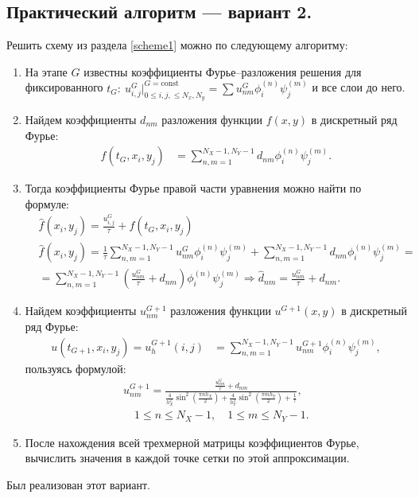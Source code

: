 \documentclass[14pt,a4paper]{extarticle}
\newcommand{\1}{\mathbbm{1}}
\begin{document}
\subsection{Практический алгоритм --- вариант 2.}
Решить схему из раздела \ref{scheme1} можно по следующему алгоритму:
\begin{enumerate}
    \item На этапе $G$ известны коэффициенты Фурье--разложения решения для фиксированного $t_G: \ u_{i, j}^{G} \big|^{G = \text{const}} _{0 \leq i, j, \leq N_x, N_y} = \sum u_{nm}^G \phi ^{(n)}_i \psi ^{(m)}_j$ и все слои до него.
    \item Найдем коэффициенты $d_{nm}$ разложения функции $f(x, y)$ в дискретный ряд Фурье: 
    \begin{align*}
     f(t_G, x_i, y_j)  &= \sum_{n, m = 1}^{N_X-1, N_Y-1} d_{nm} \phi ^{(n)}_i \psi ^{(m)}_j.
    \end{align*}
    \item Тогда коэффициенты Фурье правой части уравнения можно найти по формуле:
    \begin{align*}
     &\hat f(x_i, y_j) = \frac{u^{G}_{i, j}}{\tau} + f(t_G, x_i, y_j) \\
     &\hat f(x_i, y_j) = \frac{1}{\tau} \sum_{n, m = 1}^{N_X-1, N_Y-1}u_{nm}^G \phi ^{(n)}_i \psi ^{(m)}_j  + \sum_{n, m = 1}^{N_X-1, N_Y-1} d_{nm} \phi ^{(n)}_i \psi ^{(m)}_j = \\
     &= \sum_{n, m = 1}^{N_X-1, N_Y-1} \left(\frac{u_{nm}^G}{\tau} + d_{nm}\right) \phi ^{(n)}_i \psi ^{(m)}_j \Rightarrow \hat d_{nm} = \frac{u_{nm}^G}{\tau} + d_{nm}.
    \end{align*}
    \item Найдем коэффициенты $u_{nm}^{G+1}$ разложения функции $u^{G+1}(x, y)$ в дискретный ряд Фурье: 
    \begin{align*}
    u(t_{G+1}, x_i, y_j) = u_h^{G+1}(i, j) &= \sum_{n, m = 1}^{N_X-1, N_Y-1} u_{nm}^{G+1} \phi ^{(n)}_i \psi ^{(m)}_j,
    \end{align*}
    пользуясь формулой:
    \begin{align*}
    u_{nm}^{G+1} = \frac{\frac{u_{nm}^G}{\tau} + d_{nm}}{\frac{4}{h_X^2} \sin ^2\left(\frac{\pi n h_X}{2}\right)
    +  \frac{4}{h_Y^2} \sin ^2\left(\frac{\pi m h_Y}{2}\right) + \frac{1}{\tau}}, \\
    \quad 1 \leq n \leq N_X-1, \quad 1 \leq m \leq N_Y-1.
    \end{align*}
    \item После нахождения всей трехмерной матрицы коэффициентов Фурье, вычислить значения в каждой точке сетки по этой аппроксимации. 
\end{enumerate}
Был реализован этот вариант.
\end{document}
